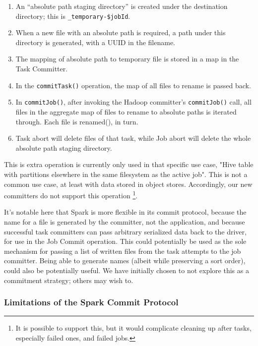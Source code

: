 \documentclass[conference]{IEEEtran}
\begin{document}
\begin{enumerate}
  \item An ``absolute path staging directory'' is created under the destination
  directory;
  this is \texttt{\_temporary-\$jobId}.
  \item When a new file with an absolute path is required, a path under this
  directory is generated, with a UUID in the filename.
  \item The mapping of absolute path to temporary file is stored in a map in the Task Committer.
  \item In the \texttt{commitTask()} operation, the map of all files to rename is passed back.
  \item In \texttt{commitJob()}, after invoking the Hadoop committer's \texttt{commitJob()}
  call, all files in the aggregate map of files to rename to absolute paths is iterated through.
  Each file is renamed(), in turn.
  \item Task abort will delete files of that task, while Job abort will delete
  the whole absolute path staging directory.
\end{enumerate}

This is extra operation is currently only used in that specific use case,
"Hive table with partitions elsewhere in the same filesystem as the active job".
This is not a common use case, at least with data stored in object stores.
Accordingly, our new committers do not support this operation
\footnote{It is possible to support this, but it would complicate cleaning up
after tasks, especially failed ones, and failed jobs.}.

It's notable here that Spark is more flexible in its commit protocol, because
the name for a file is generated by the committer, not the application,
and because successful task committers can pass arbitrary serialized data back
to the driver, for use in the Job Commit operation.
This could potentially be used as the sole mechanism for passing a list
of written files from the task attempts to the job committer.
Being able to generate names (albeit while preserving a sort order), could
also be potentially useful.
We have initially chosen to not explore this as a commitment strategy;
others may wish to.



\subsubsection{Limitations of the Spark Commit Protocol}
\end{document}
